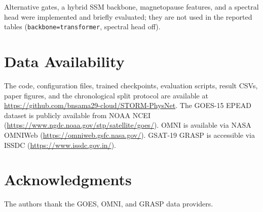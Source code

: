 \documentclass[conference]{IEEEtran}
\begin{document}
Alternative gates, a hybrid SSM backbone, magnetopause features, and a spectral head were implemented and briefly evaluated; they are not used in the reported tables (\texttt{backbone=transformer}, spectral head off).

\section*{Data Availability}
The code, configuration files, trained checkpoints, evaluation scripts,
result CSVs, paper figures, and the chronological split protocol are
available at
\url{https://github.com/bnsama29-cloud/STORM-PhysNet}.
The GOES-15 EPEAD dataset is publicly available from NOAA NCEI
(\url{https://www.ngdc.noaa.gov/stp/satellite/goes/}).
OMNI is available via NASA OMNIWeb
(\url{https://omniweb.gsfc.nasa.gov/}).
GSAT-19 GRASP is accessible via ISSDC
(\url{https://www.issdc.gov.in/}). 

\section*{Acknowledgments}
The authors thank the GOES, OMNI, and GRASP data providers.
\end{document}
